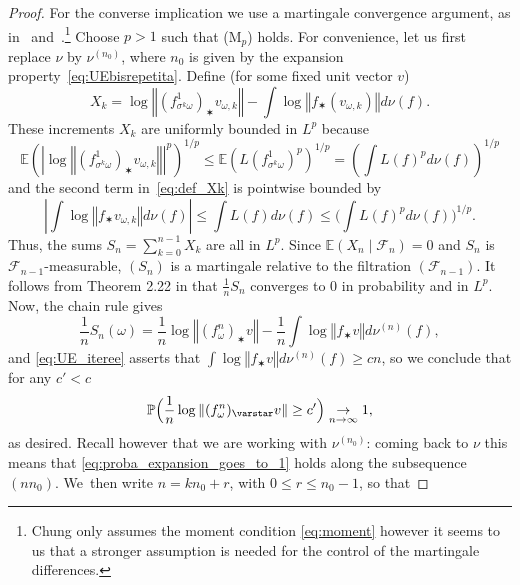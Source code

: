 \documentclass[JEP,XML,SOM,Unicode,published]{cedram}
\newcommand{\norm}[1]{{\left\Vert#1\right\Vert}}
\newcommand{\abs}[1]{\left\vert#1\right\vert}
\newcommand{\unsur}[1]{\frac{1}{#1}}
\newcommand{\lrpar}[1]{\left(#1\right)}
\newcommand{\Blrpar}[1]{\Bigl(#1\Bigr)}
\newcommand{\bblrpar}[1]{\biggl(#1\biggr)}
\newcommand{\ee}{\mathbb{E}}
\newcommand{\pp}{\mathbb{P}}\let\P\pp
\theoremstyle{plain}
\theoremstyle{definition}
\begin{document}
\begin{proof}
For the converse implication we use a martingale convergence argument, as in~\cite[Lem.\,4.3.5]{liu_thesis} and~\cite[Prop.\,2.2]{chung}.\footnote{Chung only assumes the moment condition \eqref{eq:moment} however it seems to us that a stronger assumption is needed for the
control of the martingale differences.} Choose $p>1$ such that
(M$_{p}$) holds.
For convenience, let us first replace $\nu$ by $\nu^{(n_0)}$, where $n_0$ is given by the expansion property~\eqref{eq:UEbisrepetita}.
Define (for some fixed unit vector $v$)
\begin{equation}\label{eq:def_Xk}
X_k = \log\norm{ (f^1_{\sigma^k\omega})_\varstar v_{\omega, k}} -
\int \log\norm{ f_\varstar ( v_{\omega, k})} d\nu(f).
\end{equation}
These increments $ X_k $ are uniformly bounded in $L^p$ because
\begin{equation*}
\ee\lrpar{\abs{\log\norm{ (f^1_{\sigma^k\omega})_\varstar v_{\omega, k}}}^p }^{1/p} \leq
\ee\lrpar{ L(f^1_{\sigma^k\omega})^p}^{1/p} = \lrpar{\int L(f)^p d\nu(f)}^{1/p}
\end{equation*}
and the second term in~\eqref{eq:def_Xk} is pointwise bounded by
\begin{equation*}
\abs{\int \log\norm{ f_\varstar v_{\omega, k}} d\nu(f)} \leq \int L(f) d\nu(f) \leq \bblrpar{\int L(f)^p d\nu(f)}^{1/p}.
\end{equation*}
Thus, the sums $S_n = \sum_{k=0}^{n-1} X_k$ are all in $L^p$. Since $\ee({X_{n}\mid \mathcal F_{n}})= 0$ and $S_n$ is $\mathcal{F}_{n-1}$-measurable, $(S_n)$ is a martingale relative to the filtration $(\mathcal F_{n-1})$.
It follows from Theorem 2.22 in \cite[\S 2.7]{hall-heyde} that
$\frac{1}{n}S_n$ converges to $0$ in probability and in $L^p$.
Now, the chain rule gives
\begin{equation*}
\frac{1}{n} S_n(\omega)=
\unsur{n}\log \norm { (f^n_\omega)_\varstar v} - \unsur{n} \int \log \norm { f_\varstar v} d\nu^{(n)}(f),
\end{equation*}
and \eqref{eq:UE_iteree} asserts that
$\int \log {\norm{f_\varstar v}} d\nu^{(n)}(f) \geq c n$, so we conclude that for any $c'<c$
\begin{equation}\label{eq:proba_expansion_goes_to_1}
\pp\Blrpar{ \unsur{n}\log \norm{ (f^n_\omega)_\varstar v} \geq c'} \underset{n\to\infty}{\to} 1,
\end{equation}
as desired. Recall however that we are working with $\nu^{(n_0)}$:
coming back to $\nu$ this means that \eqref{eq:proba_expansion_goes_to_1} holds
along the subsequence $(nn_0)$. We~then write $n = kn_0+ r$, with $0\leq r \leq n_0-1$, so that

\end{proof}
\end{document}
